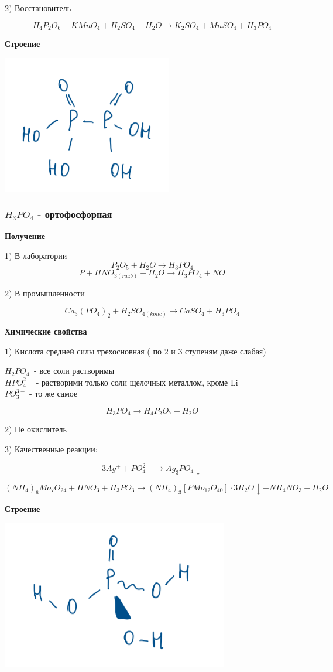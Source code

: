 \documentclass[14pt,a4paper]{scrartcl}
\begin{document}
2) Восстановитель

$$H_4P_2O_6 + KMnO_4 + H_2SO_4 + H_2O \rightarrow K_2SO_4 + MnSO_4+ H_3PO_4$$

\textbf{Строение}

\includegraphics{9v10.png}

\subsubsection{$H_3PO_4$ - ортофосфорная}

\textbf{Получение}

1) В лаборатории
$$P_2O_5 + H_2O \rightarrow H_3PO_4$$
$$P + HNO_{3(razb)} + H_2O \rightarrow H_3PO_4 + NO$$

2) В промышленности

$$Ca_3(PO_4)_2 + H_2SO_{4(konc)} \rightarrow  CaSO_4 + H_3PO_4$$

\textbf{Химические свойства}

1) Кислота средней силы трехосновная ( по 2 и 3 ступеням даже слабая)

$H_2PO_4^-$ - все соли растворимы\\
$HPO_4^{2-}$ - растворими только соли щелочных металлом, кроме Li\\
$PO_3^{3-}$ - то же самое

$$H_3PO_4 \rightarrow H_4P_2O_7 + H_2O$$

2) Не окислитель

3) Качественные реакции:

$$3Ag^+ + PO_4^{2-} \rightarrow Ag_3PO_4\downarrow$$

$$(NH_4)_6Mo_7O_24 + HNO_3 + H_3PO_3 \rightarrow (NH_4)_3[PMo_12O_40]\cdot 3H_2O\downarrow + NH_4NO_3 + H_2O$$

\textbf{Строение}

\includegraphics{9v11.png}
\end{document}
